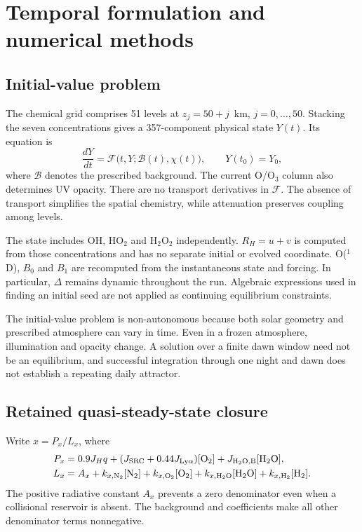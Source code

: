 \chapter{Temporal formulation and numerical methods}\label{ch:temporal}
\section{Initial-value problem}
The chemical grid comprises 51 levels at $z_j=50+j$~km, $j=0,\ldots,50$. Stacking the seven concentrations gives a 357-component physical state $Y(t)$. Its equation is
\begin{equation}\frac{dY}{dt}=\mathcal F\bigl(t,Y;\mathcal B(t),\chi(t)\bigr),\qquad Y(t_0)=Y_0,\label{eq:IVP}\end{equation}
where $\mathcal B$ denotes the prescribed background. The current O/O$_3$ column also determines UV opacity. There are no transport derivatives in $\mathcal F$. The absence of transport simplifies the spatial chemistry, while attenuation preserves coupling among levels.

The state includes OH, HO$_2$ and H$_2$O$_2$ independently. $R_H=u+v$ is computed from those concentrations and has no separate initial or evolved coordinate. O($^1$D), $B_0$ and $B_1$ are recomputed from the instantaneous state and forcing. In particular, $\Delta$ remains dynamic throughout the run. Algebraic expressions used in finding an initial seed are not applied as continuing equilibrium constraints.

The initial-value problem is non-autonomous because both solar geometry and prescribed atmosphere can vary in time. Even in a frozen atmosphere, illumination and opacity change. A solution over a finite dawn window need not be an equilibrium, and successful integration through one night and dawn does not establish a repeating daily attractor.

\section{Retained quasi-steady-state closure}
Write $x=P_x/L_x$, where
\begin{align}
P_x&=0.9J_Hq+(J_{\mathrm{SRC}}+0.44J_{\mathrm{Ly\alpha}})[\mathrm{O}_2]+J_{\mathrm{H_2O,B}}[\mathrm{H_2O}],\nonumber\\
L_x&=A_x+k_{x,\mathrm{N_2}}[\mathrm{N_2}]+k_{x,\mathrm{O_2}}[\mathrm{O}_2]
+k_{x,\mathrm{H_2O}}[\mathrm{H_2O}]+k_{x,\mathrm{H_2}}[\mathrm{H_2}].
\label{eq:qssax}
\end{align}
The positive radiative constant $A_x$ prevents a zero denominator even when a collisional reservoir is absent. The background and coefficients make all other denominator terms nonnegative.

